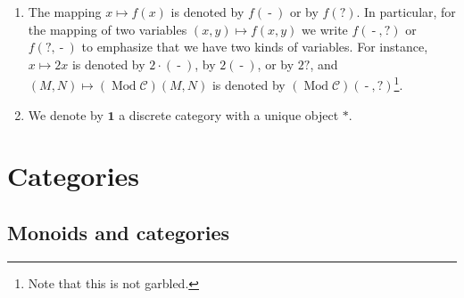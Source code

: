 \documentclass{surv-l}
\numberwithin{equation}{chapter}
\numberwithin{figure}{chapter}
\theoremstyle{plain}
\theoremstyle{definition}
\theoremstyle{remark}
\DeclareMathOperator{\Mod}{Mod}
\DeclareMathOperator{\blank}{-}
\begin{document}
\begin{enumerate}
For instance, choose one $j \in I$ and take $a \in A_j$.
Then we write the notation
$(\delta_{i,j}a)_{i\in I} \in \prod_{i\in I}A_i$ in the following sense:
For each $i \in I$, we have
\[
\delta_{i,j}a =
\begin{cases}
a & (i = j),\\
0_i & (i \ne j).
\end{cases}
\]
If $i \ne j$, then since originally $a \in A_j$, we have to have $0a = 0_j$,
but we read it $0_j = 0 = 0_i$ because
$0a = \delta_{i,j}a \in A_i$.
\item
The mapping $x \mapsto f(x)$ is denoted by
$f(\blank)$ or by $f(?)$.
In particular, for the mapping of two variables
$(x, y) \mapsto f(x,y)$ we write $f(\blank, ?)$ or $f(?, \blank)$
to emphasize that we have two kinds of variables.
For instance, $x \mapsto 2x$ is denoted by
$2\cdot (\blank)$, by $2(\blank)$, or by $2?$, and
$(M, N) \mapsto (\Mod{\mathcal{C}})(M, N)$ is denoted by
$(\Mod{\mathcal{C}})(\blank, ?)$\footnote{Note that this is not garbled.}.

\item
We denote by $\mathbf{1}$ a discrete category with a unique object $*$.
\end{enumerate}



\mainmatter 

\chapter{Categories}\label{ch:cat}\label{ch:1}
\section{Monoids and categories}
\end{document}
